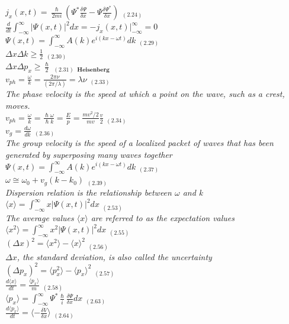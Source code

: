 \documentclass[0pt]{report}
\begin{document}
\begin{multicols}{3}
\begin{flushleft}
$j_x(x,t)=\frac{\hslash}{2mi}(\Psi^*\frac{\delta \Psi}{\delta x}-\Psi\frac{\delta \Psi^*}{\delta x})$ $_{(2.24)}$\\
$\frac{d}{dt}\int_{-\infty}^{\infty}|\Psi(x,t)|^2dx=-j_x(x,t)|_{-\infty}^{\infty}=0$\\
$\Psi(x,t)=\int_{-\infty}^{\infty}A(k)e^{i(kx-\omega t)}dk$ $_{(2.29)}$\\
$\Delta x\Delta k\geq\frac{1}{2}$ $_{(2.30)}$\\
$\Delta x\Delta p_x\geq\frac{\hslash}{2}$ $_{(2.31)}$ $_{\textbf{Heisenberg}}$\\
$v_{ph}=\frac{\omega}{k}=\frac{2\pi\nu}{(2\pi/\lambda)}=\lambda\nu$ $_{(2.33)}$\\
\textit{The phase velocity is the speed at which a point on the wave, such as a crest, moves.}\\
$v_{ph}=\frac{\omega}{k}=\frac{\hslash\omega}{\hslash k}=\frac{E}{p}=\frac{mv^2/2}{mv}\frac{v}{2}$ $_{(2.34)}$\\
$v_g=\frac{d\omega}{dk}$ $_{(2.36)}$\\
\textit{The group velocity is the speed of a localized packet of waves that has been generated by superposing many waves together}\\
$\Psi(x,t)=\int_{-\infty}^{\infty}A(k)e^{i(kx-\omega t)}dk$ $_{(2.37)}$\\
$\omega\cong\omega_0+v_g(k-k_0)$ $_{(2.39)}$\\
\textit{Dispersion relation is the relationship between $\omega$ and k}\\
$\langle x\rangle =\int_{-\infty}^{\infty}x|\Psi(x,t)|^2dx$ $_{(2.53)}$\\
\textit{The average values $\langle x\rangle $ are referred to as the expectation values}\\
$\langle x^2\rangle =\int_{-\infty}^{\infty}x^2|\Psi(x,t)|^2dx$ $_{(2.55)}$\\
$(\Delta x)^2=\langle x^2\rangle -\langle x\rangle ^2$ $_{(2.56)}$\\
\textit{$\Delta x$, the standard deviation, is also called the uncertainty}\\
$(\Delta p_x)^2=\langle p_x^2\rangle -\langle p_x\rangle ^2$ $_{(2.57)}$\\
$\frac{d\langle x\rangle }{dt}=\frac{\langle p_x\rangle }{m}$ $_{(2.58)}$\\
$\langle p_x\rangle =\int_{-\infty}^{\infty}\Psi^*\frac{\hslash}{i}\frac{\delta\Psi}{\delta x}dx$ $_{(2.63)}$\\
$\frac{d\langle p_x\rangle }{dt}=\langle-\frac{\delta V}{\delta x}\rangle$ $_{(2.64)}$\\

\end{flushleft}
\end{multicols}
\end{document}
